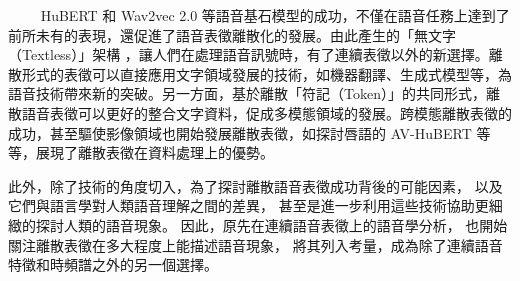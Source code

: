 　　
HuBERT \cite{hsu_hubert_2021, hsu_hubert_2021-2} 和 Wav2vec 2.0 \cite{baevski2020wav2vec} 等語音基石模型的成功，不僅在語音任務上達到了前所未有的表現，還促進了語音表徵離散化的發展。由此產生的「無文字（Textless）」架構 \cite{noauthor_textless_2021, lakhotia_generative_2021, lakhotia_generative_2021-1}，讓人們在處理語音訊號時，有了連續表徵以外的新選擇。離散形式的表徵可以直接應用文字領域發展的技術，如機器翻譯、生成式模型等，為語音技術帶來新的突破。另一方面，基於離散「符記（Token）」的共同形式，離散語音表徵可以更好的整合文字資料，促成多模態領域的發展。跨模態離散表徵的成功，甚至驅使影像領域也開始發展離散表徵，如探討唇語的 AV-HuBERT \cite{shi2021learning} 等等，展現了離散表徵在資料處理上的優勢。

此外，除了技術的角度切入，為了探討離散語音表徵成功背後的可能因素，
以及它們與語言學對人類語音理解之間的差異，
甚至是進一步利用這些技術協助更細緻的探討人類的語音現象。
因此，原先在連續語音表徵上的語音學分析，
也開始關注離散表徵在多大程度上能描述語音現象，
將其列入考量，成為除了連續語音特徵和時頻譜之外的另一個選擇。
